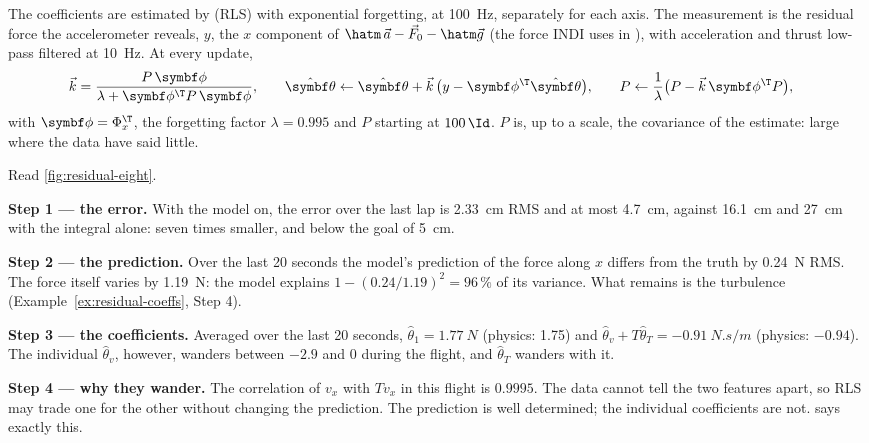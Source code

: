 The coefficients are estimated by  (RLS) with exponential forgetting, at \SI{100}{Hz}, separately for each axis. The measurement is the residual force the accelerometer reveals, $y$, the $x$ component of $\hatm\,\vec a - \vec F_0 - \hatm\vec g$ (the force INDI uses in ), with acceleration and thrust low-pass filtered at \SI{10}{Hz}. At every update,
\begin{equation}\label{eq:residual-rls}
  \begin{aligned}
  \vec k &= \frac{P\,\symbf\phi}{\lambda + \symbf\phi^\T P\,\symbf\phi}, &\quad
  \hat{\symbf\theta} &\leftarrow \hat{\symbf\theta} + \vec k\,\big(y - \symbf\phi^\T\hat{\symbf\theta}\big), &\quad
  P &\leftarrow \frac{1}{\lambda}\big(P - \vec k\,\symbf\phi^\T P\big),
  \end{aligned}
\end{equation}
with $\symbf\phi = \Phi_x^\T$, the forgetting factor $\lambda = 0.995$ and $P$ starting at $100\,\Id$. $P$ is, up to a scale, the covariance of the estimate: large where the data have said little.


\begin{example}
\label{ex:residual-flight}
Read \cref{fig:residual-eight}.

\textbf{Step 1 — the error.} With the model on, the error over the last lap is \SI{2.33}{cm} RMS and at most \SI{4.7}{cm}, against \SI{16.1}{cm} and \SI{27}{cm} with the integral alone: seven times smaller, and below the goal of \SI{5}{cm}.

\textbf{Step 2 — the prediction.} Over the last 20 seconds the model's prediction of the force along $x$ differs from the truth by \SI{0.24}{N} RMS. The force itself varies by \SI{1.19}{N}: the model explains $1 - (0.24/1.19)^2 = 96\,\%$ of its variance. What remains is the turbulence (Example~\ref{ex:residual-coeffs}, Step 4).

\textbf{Step 3 — the coefficients.} Averaged over the last 20 seconds, $\hat\theta_1 = \SI{1.77}{N}$ (physics: 1.75) and $\hat\theta_v + T\hat\theta_T = \SI{-0.91}{N.s/m}$ (physics: $-0.94$). The individual $\hat\theta_v$, however, wanders between $-2.9$ and $0$ during the flight, and $\hat\theta_T$ wanders with it.

\textbf{Step 4 — why they wander.} The correlation of $v_x$ with $T v_x$ in this flight is $0.9995$. The data cannot tell the two features apart, so RLS may trade one for the other without changing the prediction. The prediction is well determined; the individual coefficients are not.  says exactly this.
\end{example}

